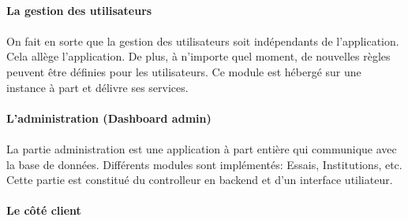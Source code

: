 \paragraph{La gestion des utilisateurs}
\paragraph{}
On fait en sorte que la gestion des utilisateurs soit indépendants de l'application.
Cela allège l'application. De plus, à n'importe quel moment, de nouvelles règles peuvent être définies
pour les utilisateurs. Ce module est hébergé sur une instance à part et délivre ses services.
\paragraph{L'administration (Dashboard admin)}
\paragraph{}
La partie administration est une application à part entière qui communique avec la base de données.
Différents modules sont implémentés: Essais, Institutions, etc. Cette partie est constitué du controlleur
en backend et d'un interface utiliateur.
\paragraph{Le côté client}

